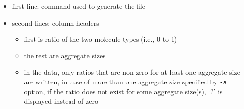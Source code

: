 \begin{enumerate}[nosep,leftmargin=20pt]
\begin{itemize}[nosep,leftmargin=5pt]
    \item first line: command used to generate the file
    \item second lines: column headers
      \begin{itemize}[nosep,leftmargin=10pt]
        \item first is ratio of the two molecule types (i.e., 0 to 1)
        \item the rest are aggregate sizes
        \item in the data, only ratios that are non-zero for at least one
          aggregate size are written; in case of more than one aggregate
          size specified by \texttt{-a} option, if the ratio does not exist
          for some aggregate size(s), `?' is displayed instead of zero
      \end{itemize}
  \end{itemize}
\end{enumerate}
